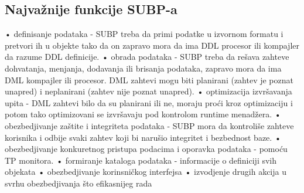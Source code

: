 \documentclass{article}
\begin{document}
\subsection{Najvažnije funkcije SUBP-a}
\hspace*{0.2cm}
• definisanje podataka - SUBP treba da primi podatke u izvornom formatu i
pretvori ih u objekte tako da on zapravo mora da ima DDL procesor ili
kompajler da razume DDL definicije.
\newline \hspace*{0.2cm}
• obrada podataka - SUBP treba da rešava zahteve dohvatanja, menjanja,
dodavanja ili brisanja podataka, zapravo mora da ima DML kompajler ili
procesor. DML zahtevi mogu biti planirani (zahtev je poznat unapred) i
neplanirani (zahtev nije poznat unapred).
\newline \hspace*{0.2cm}
• optimizacija izvršavanja upita - DML zahtevi bilo da su planirani ili ne,
moraju proći kroz optimizaciju i potom tako optimizovani se izvršavaju pod
kontrolom runtime menadžera.
\newline \hspace*{0.2cm}
• obezbedjivanje zaštite i integriteta podataka - SUBP mora da kontroliše
zahteve korisnika i odbije svaki zahtev koji bi narušio integritet i
bezbednost baze.
\newline \hspace*{0.2cm}
• obezbedjivanje konkuretnog pristupa podacima i oporavka podataka - pomoću
TP monitora.
\newline \hspace*{0.2cm}
• formiranje kataloga podataka - informacije o definiciji svih objekata
\newline \hspace*{0.2cm}
• obezbedjivanje korinsničkog interfejsa
\newline \hspace*{0.2cm}
• izvodjenje drugih akcija u svrhu obezbedjivanja što efikasnijeg rada
\end{document}
